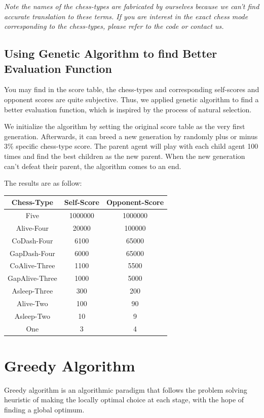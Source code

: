 \documentclass[12pt,a4paper]{article}
\begin{document}
\noindent\begin{small}\emph{Note the names of the chess-types are fabricated by ourselves because we can't find accurate translation to these terms. If you are interest in the exact chess mode corresponding to the chess-types, please refer to the code or contact us.}\end{small}

\subsection{Using Genetic Algorithm to find Better Evaluation Function}
You may find in the score table, the chess-types and corresponding self-scores and opponent scores are quite subjective. Thus, we applied genetic algorithm to find a better evaluation function, which is inspired by the process of natural selection. 

We initialize the algorithm by setting the original score table as the very first generation. Afterwards, it can breed a new generation by randomly plus or minus 3\% specific chess-type score. The parent agent will play with each child agent 100 times and find the best children as the new parent. When the new generation can't defeat their parent, the algorithm comes to an end.

The results are as follow:
\begin{table}[h]
\centering
\begin{tabular}{c|c|c}
\hline
Chess-Type&Self-Score&Opponent-Score  \\
\hline
Five&1000000&1000000\\
Alive-Four&20000&100000\\
CoDash-Four&6100&65000\\
GapDash-Four&6000&65000\\
CoAlive-Three&1100&5500\\
GapAlive-Three&1000&5000\\
Asleep-Three&300&200\\
Alive-Two&100&90\\
Asleep-Two&10&9\\
One&3&4\\
\hline
\end{tabular}
\end{table}


\section{Greedy Algorithm}
Greedy algorithm is an algorithmic paradigm that follows the problem solving heuristic of making the locally optimal choice at each stage, with the hope of finding a global optimum.
\end{document}
